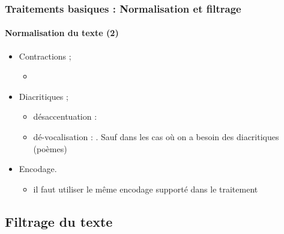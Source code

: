 \documentclass[xcolor=table]{beamer}
\begin{document}
\begin{frame}
\frametitle{Traitements basiques : Normalisation et filtrage}
\framesubtitle{Normalisation du texte (2)}
\begin{itemize}
	
	\item Contractions ;
	\begin{itemize}
		\item {}
	\end{itemize}
	
	\item Diacritiques ;
	\begin{itemize}
		\item désaccentuation :  
		\item dé-vocalisation :  . Sauf dans les cas où on a besoin des diacritiques (poèmes)
	\end{itemize}

	\item Encodage.
	\begin{itemize}
		\item il faut utiliser le même encodage supporté dans le traitement
	\end{itemize}

\end{itemize}

\end{frame}

\subsection{Filtrage du texte}
\end{document}
